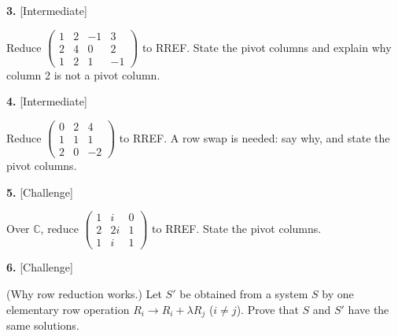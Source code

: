 \documentclass[11pt]{article}
\begin{document}
\begin{minipage}{\linewidth}\textbf{3.} \hfill{\scriptsize\color{ink}[Intermediate]}\par\nopagebreak Reduce $\begin{pmatrix}1 & 2 & -1 & 3 \\ 2 & 4 & 0 & 2 \\ 1 & 2 & 1 & -1\end{pmatrix}$ to RREF. State the pivot columns and explain why column 2 is not a pivot column.
\vspace{3.8cm}\end{minipage}\par\vspace{4pt}
\begin{minipage}{\linewidth}\textbf{4.} \hfill{\scriptsize\color{ink}[Intermediate]}\par\nopagebreak Reduce $\begin{pmatrix}0 & 2 & 4 \\ 1 & 1 & 1 \\ 2 & 0 & -2\end{pmatrix}$ to RREF. A row swap is needed: say why, and state the pivot columns.
\vspace{3.8cm}\end{minipage}\par\vspace{4pt}
\begin{minipage}{\linewidth}\textbf{5.} \hfill{\scriptsize\color{ink}[Challenge]}\par\nopagebreak Over $\mathbb{C}$, reduce $\begin{pmatrix}1 & i & 0 \\ 2 & 2i & 1 \\ 1 & i & 1\end{pmatrix}$ to RREF. State the pivot columns.
\vspace{3.4cm}\end{minipage}\par\vspace{4pt}
\begin{minipage}{\linewidth}\textbf{6.} \hfill{\scriptsize\color{ink}[Challenge]}\par\nopagebreak (Why row reduction works.) Let $S'$ be obtained from a system $S$ by one elementary row operation $R_i\to R_i+\lambda R_j$ ($i\neq j$). Prove that $S$ and $S'$ have the same solutions.
\vspace{4.1cm}\end{minipage}\par\vspace{4pt}
\end{document}
